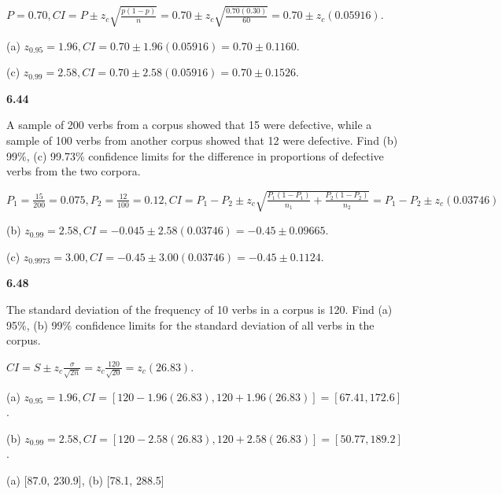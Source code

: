 \documentclass[11pt,letterpaper]{scrartcl}
\begin{document}
$P = 0.70, CI = P \pm z_{c} \sqrt{\frac{p(1-p)}{n}} = 0.70 \pm z_{c} \sqrt{\frac{0.70(0.30)}{60}} = 0.70 \pm z_{c}(0.05916)$.

(a) $z_{0.95} = 1.96, CI = 0.70 \pm 1.96(0.05916) = 0.70 \pm 0.1160$.

(c) $z_{0.99} = 2.58, CI = 0.70 \pm 2.58(0.05916) = 0.70 \pm 0.1526$.

\textbf{6.44}

A sample of 200 verbs from a corpus showed that 15 were defective, while a sample of 100 verbs from another corpus showed that 12 were defective. 
Find (b) 99\%, (c) 99.73\% confidence limits for the difference in proportions of defective verbs from the two corpora.

$P_{1}=\frac{15}{200} = 0.075, P_{2} = \frac{12}{100}=0.12, CI = P_{1} - P_{2} \pm z_{c} \sqrt{\frac{P_{1}(1-P_{1})}{n_{1}} + \frac{P_{2}(1-P_{2})}{n_{2}} } = P_{1} - P_{2} \pm z_{c}(0.03746) $

(b) $z_{0.99} = 2.58, CI = -0.045 \pm 2.58(0.03746) = -0.45 \pm 0.09665$.

(c) $z_{0.9973} = 3.00, CI = -0.45 \pm 3.00(0.03746) = -0.45 \pm 0.1124$.

\textbf{6.48}

The standard deviation of the frequency of 10 verbs in a corpus is 120. 
Find (a) 95\%, (b) 99\% confidence limits for the standard deviation of all verbs in the corpus.

$CI = S \pm z_{c} \frac{\sigma}{\sqrt{2n}} = z_{c} \frac{120}{\sqrt{20}} = z_{c}(26.83)$.

(a) 
$z_{0.95} = 1.96, CI = [120 - 1.96(26.83), 120 + 1.96(26.83)] = [67.41, 172.6]$.

(b) $z_{0.99} = 2.58, CI = [120 - 2.58(26.83), 120 + 2.58(26.83)] = [50.77, 189.2]$.

{\color{red} (a) [87.0, 230.9], (b) [78.1, 288.5]}
\end{document}
